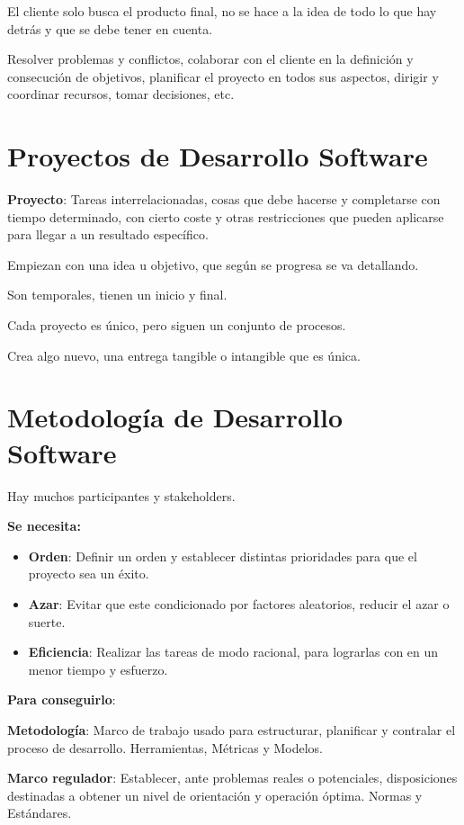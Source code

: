 \documentclass[12pt]{report} %
\begin{document}
El cliente solo busca el producto final, no se hace a la idea de todo lo
que hay detrás y que se debe tener en cuenta.

Resolver problemas y conflictos, colaborar con el cliente en la
definición y consecución de objetivos, planificar el proyecto en todos
sus aspectos, dirigir y coordinar recursos, tomar decisiones, etc.

\section{Proyectos de Desarrollo Software}

\textbf{Proyecto}: Tareas interrelacionadas, cosas que debe hacerse y
completarse con tiempo determinado, con cierto coste y otras
restricciones que pueden aplicarse para llegar a un resultado
específico.

Empiezan con una idea u objetivo, que según se progresa se va
detallando.

Son temporales, tienen un inicio y final.

Cada proyecto es único, pero siguen un conjunto de procesos.

Crea algo nuevo, una entrega tangible o intangible que es única.

\section{Metodología de Desarrollo
Software}

Hay muchos participantes y stakeholders.

\textbf{Se necesita:}

\begin{itemize}

\item
  \textbf{Orden}: Definir un orden y establecer distintas prioridades
  para que el proyecto sea un éxito.
\item
  \textbf{Azar}: Evitar que este condicionado por factores aleatorios,
  reducir el azar o suerte.
\item
  \textbf{Eficiencia}: Realizar las tareas de modo racional, para
  lograrlas con en un menor tiempo y esfuerzo.
\end{itemize}

\textbf{Para conseguirlo}:

\textbf{Metodología}: Marco de trabajo usado para estructurar,
planificar y contralar el proceso de desarrollo. Herramientas, Métricas
y Modelos.

\textbf{Marco regulador}: Establecer, ante problemas reales o
potenciales, disposiciones destinadas a obtener un nivel de orientación
y operación óptima. Normas y Estándares.
\end{document}
